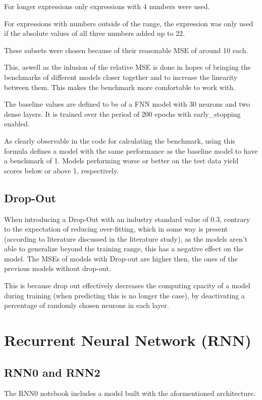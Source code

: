 \documentclass{article}
\begin{document}
For longer expressions only expressions with 4 numbers were used.

For expressions with numbers outside of the range, the expression was only 
used if the absolute values of all three numbers added up to 22.

These subsets were chosen because of their reasonable MSE of around 10 each.

This, aswell as the inlusion of the relative MSE is done in hopes of 
bringing the benchmarks of different models closer together and to increase 
the linearity between them. This makes the benchmark more comfortable to 
work with.

The baseline values are defined to be of a FNN model with 30 neurons and two 
dense layers. It is trained over the period of 200 epochs with 
early\_stopping enabled.

As clearly observable in the code for calculating the benchmark, using this 
formula defines a model with the same performance as the baseline model to 
have a benchmark of 1. Models performing worse or better on the test data 
yield scores below or above 1, respectively.


\subsection{Drop-Out}
When introducing a Drop-Out with an industry standard value of 0.3, contrary 
to the expectation of reducing over-fitting, which in some way is present 
(according to literature discussed in the literature study), as the models 
aren't able to generalize beyond the training range, this has a negative 
effect on the model. The MSEs of models with Drop-out are higher then, the 
ones of the previous models without drop-out. 

This is because drop out effectively decreases the computing cpacity of a 
model during training (when predicting this is no longer the case), by 
deactivating a percentage of randomly chosen neurons in each layer.

\section{Recurrent Neural Network (RNN)}

\subsection{RNN0 and RNN2}
The RNN0 notebook includes a model built with the aformentioned architecture.
\end{document}

